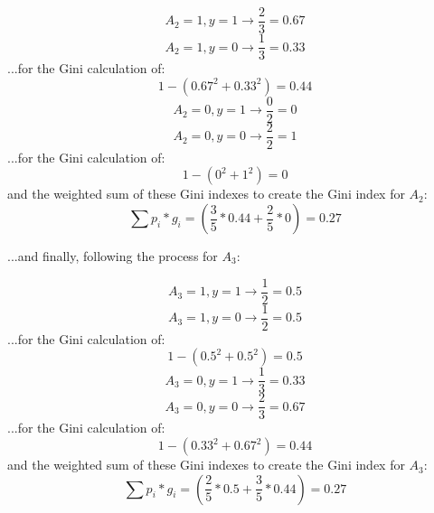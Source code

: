 \documentclass{article}
\begin{document}
\begin{equation}
    {A_2=1,y=1} \rightarrow \frac{2}{3} = 0.67
\end{equation}
\begin{equation}
    {A_2=1,y=0} \rightarrow \frac{1}{3} = 0.33
\end{equation}
\noindent ...for the Gini calculation of:
\begin{equation}
    1-(0.67^2 + 0.33^2) = 0.44
\end{equation}
\begin{equation}
    {A_2=0,y=1} \rightarrow \frac{0}{2} = 0
\end{equation}
\begin{equation}
    {A_2=0,y=0} \rightarrow \frac{2}{2} = 1
\end{equation}
\noindent ...for the Gini calculation of:
\begin{equation}
    1-(0^2 + 1^2) = 0
\end{equation}
\noindent and the weighted sum of these Gini indexes to create the Gini index for $A_2$:
\begin{equation}
    \sum p_i * g_i = (\frac{3}{5}*0.44 + \frac{2}{5}*0) = 0.27
\end{equation}

\noindent ...and finally, following the process for $A_3$:

\begin{equation}
    {A_3=1,y=1} \rightarrow \frac{1}{2} = 0.5
\end{equation}
\begin{equation}
    {A_3=1,y=0} \rightarrow \frac{1}{2} = 0.5
\end{equation}
\noindent ...for the Gini calculation of:
\begin{equation}
    1-(0.5^2 + 0.5^2) = 0.5
\end{equation}
\begin{equation}
    {A_3=0,y=1} \rightarrow \frac{1}{3} = 0.33
\end{equation}
\begin{equation}
    {A_3=0,y=0} \rightarrow \frac{2}{3} = 0.67
\end{equation}
\noindent ...for the Gini calculation of:
\begin{equation}
    1-(0.33^2 + 0.67^2) = 0.44
\end{equation}
\noindent and the weighted sum of these Gini indexes to create the Gini index for $A_3$:
\begin{equation}
    \sum p_i * g_i = (\frac{2}{5}*0.5 + \frac{3}{5}*0.44) = 0.27
\end{equation}
\end{document}

